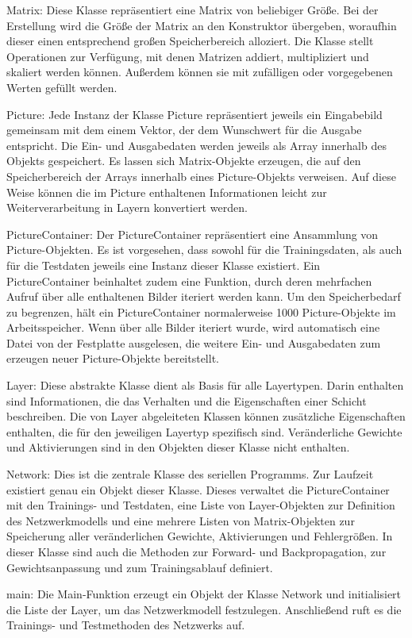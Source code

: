 \documentclass[../main.tex]{subfiles}
\begin{document}
\begin{description}
\item{Matrix:} Diese Klasse repräsentiert eine Matrix von beliebiger Größe. Bei der Erstellung wird die Größe der Matrix an den Konstruktor übergeben, woraufhin dieser einen entsprechend großen Speicherbereich alloziert. Die Klasse stellt Operationen zur Verfügung, mit denen Matrizen addiert, multipliziert und skaliert werden können. Außerdem können sie mit zufälligen oder vorgegebenen Werten gefüllt werden. 
\item{Picture:} Jede Instanz der Klasse Picture repräsentiert jeweils ein Eingabebild gemeinsam mit dem einem Vektor, der dem Wunschwert für die Ausgabe entspricht. Die Ein- und Ausgabedaten werden jeweils als Array innerhalb des Objekts gespeichert. Es lassen sich Matrix-Objekte erzeugen, die auf den Speicherbereich der Arrays innerhalb eines Picture-Objekts verweisen. Auf diese Weise können die im Picture enthaltenen Informationen leicht zur Weiterverarbeitung in Layern konvertiert werden. 
\item{PictureContainer:} Der PictureContainer repräsentiert eine Ansammlung von Picture-Objekten. Es ist vorgesehen, dass sowohl für die Trainingsdaten, als auch für die Testdaten jeweils eine Instanz dieser Klasse existiert. Ein PictureContainer beinhaltet zudem eine Funktion, durch deren mehrfachen Aufruf über alle enthaltenen Bilder iteriert werden kann. Um den Speicherbedarf zu begrenzen, hält ein PictureContainer normalerweise 1000 Picture-Objekte im Arbeitsspeicher. Wenn über alle Bilder iteriert wurde, wird automatisch eine Datei von der Festplatte ausgelesen, die weitere Ein- und Ausgabedaten zum erzeugen neuer Picture-Objekte  bereitstellt. 
\item{Layer:} Diese abstrakte Klasse dient als Basis für alle Layertypen. Darin enthalten sind Informationen, die das Verhalten und die Eigenschaften einer Schicht beschreiben. Die von Layer abgeleiteten Klassen können zusätzliche Eigenschaften enthalten, die für den jeweiligen Layertyp spezifisch sind. Veränderliche Gewichte und Aktivierungen sind in den Objekten dieser Klasse nicht enthalten. 
\item{Network:} Dies ist die zentrale Klasse des seriellen Programms. Zur Laufzeit existiert genau ein Objekt dieser Klasse. Dieses verwaltet die PictureContainer mit den Trainings- und Testdaten, eine Liste von Layer-Objekten zur Definition des Netzwerkmodells und eine mehrere Listen von Matrix-Objekten zur Speicherung aller veränderlichen Gewichte, Aktivierungen und Fehlergrößen. In dieser Klasse sind auch die Methoden zur Forward- und Backpropagation, zur Gewichtsanpassung und zum Trainingsablauf definiert. 
\item{main:} Die Main-Funktion erzeugt ein Objekt der Klasse Network und initialisiert die Liste der Layer, um das Netzwerkmodell festzulegen. Anschließend ruft es die Trainings- und Testmethoden des Netzwerks auf. 
\end{description}
\end{document}
